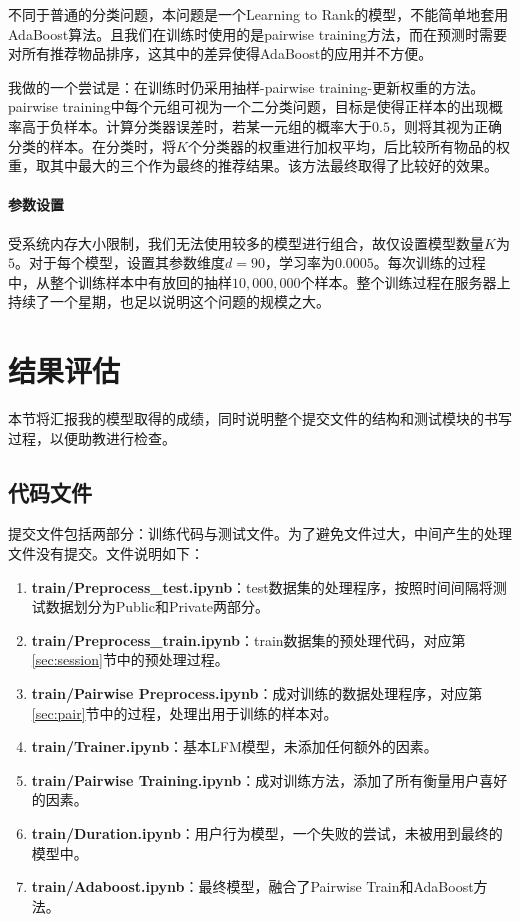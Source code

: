 \documentclass[12pt]{article} %
\begin{document}
\begin{sloppypar}
不同于普通的分类问题，本问题是一个Learning to Rank的模型，不能简单地套用AdaBoost算法。且我们在训练时使用的是pairwise training方法，而在预测时需要对所有推荐物品排序，这其中的差异使得AdaBoost的应用并不方便。

我做的一个尝试是：在训练时仍采用抽样-pairwise training-更新权重的方法。pairwise training中每个元组可视为一个二分类问题，目标是使得正样本的出现概率高于负样本。计算分类器误差时，若某一元组的概率大于$0.5$，则将其视为正确分类的样本。在分类时，将$K$个分类器的权重进行加权平均，后比较所有物品的权重，取其中最大的三个作为最终的推荐结果。该方法最终取得了比较好的效果。

\paragraph{参数设置}
受系统内存大小限制，我们无法使用较多的模型进行组合，故仅设置模型数量$K$为$5$。对于每个模型，设置其参数维度$d=90$，学习率为$0.0005$。每次训练的过程中，从整个训练样本中有放回的抽样$10,000,000$个样本。整个训练过程在服务器上持续了一个星期，也足以说明这个问题的规模之大。


\section{结果评估}

本节将汇报我的模型取得的成绩，同时说明整个提交文件的结构和测试模块的书写过程，以便助教进行检查。

\subsection{代码文件}

提交文件包括两部分：训练代码与测试文件。为了避免文件过大，中间产生的处理文件没有提交。文件说明如下：
\begin{enumerate}
\item {\bf train/Preprocess\_test.ipynb}：test数据集的处理程序，按照时间间隔将测试数据划分为Public和Private两部分。
\item {\bf train/Preprocess\_train.ipynb}：train数据集的预处理代码，对应第\ref{sec:session}节中的预处理过程。
\item {\bf train/Pairwise Preprocess.ipynb}：成对训练的数据处理程序，对应第\ref{sec:pair}节中的过程，处理出用于训练的样本对。
\item {\bf train/Trainer.ipynb}：基本LFM模型，未添加任何额外的因素。
\item {\bf train/Pairwise Training.ipynb}：成对训练方法，添加了所有衡量用户喜好的因素。
\item {\bf train/Duration.ipynb}：用户行为模型，一个失败的尝试，未被用到最终的模型中。
\item {\bf train/Adaboost.ipynb}：最终模型，融合了Pairwise Train和AdaBoost方法。
\end{enumerate}


\end{sloppypar}
\end{document}
